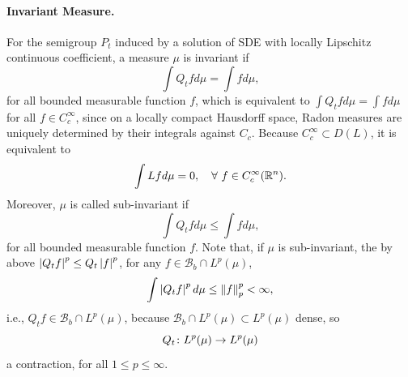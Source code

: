 \paragraph{Invariant Measure.} For the semigroup $P_t$ induced by a solution of SDE with locally Lipschitz continuous coefficient, a measure $\mu$ is invariant if
\begin{equation*}
    \int Q_tf d\mu = \int f d\mu,
\end{equation*}
for all bounded measurable function $f$, which is equivalent to $\int Q_tf d\mu = \int f d\mu$ for all $f \in C_c^\infty$, since on a locally compact Hausdorff space, Radon measures are uniquely determined by their integrals against $C_c$. Because $C_c^\infty \subset D(L)$, it is equivalent to
\begin{equation*}
    \int Lf d\mu = 0,\quad \forall~f \in C_c^\infty(\mathbb{R}^n).
\end{equation*}
Moreover, $\mu$ is called sub-invariant if 
\begin{equation*}
    \int Q_tf d\mu \leq \int f d\mu,
\end{equation*}
for all bounded measurable function $f$. Note that, if $\mu$ is sub-invariant, the by above $\left\lvert Q_t f\right\lvert^p \leq Q_t \left\lvert f\right\lvert^p$, for any $f \in \mathcal{B}_b \cap L^p(\mu)$,
\begin{equation*}
    \int \left\lvert Q_t f\right\lvert^p d\mu \leq \left\lVert f\right\lVert_p^p < \infty,
\end{equation*}
i.e., $Q_t f \in \mathcal{B}_b \cap L^p(\mu)$, because $\mathcal{B}_b \cap L^p(\mu) \subset L^p(\mu)$ dense, so
\begin{equation*}
    Q_t \colon  L^p(\mu) \rightarrow  L^p(\mu)
\end{equation*}
a contraction, for all $1 \leq p \leq \infty$.

